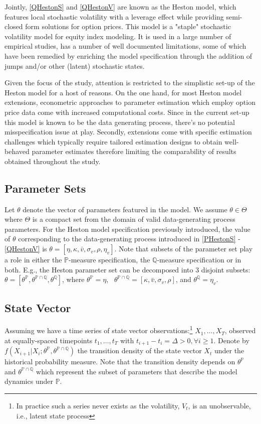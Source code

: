 \documentclass[11pt,a4paper,notitlepage]{article}
\numberwithin{equation}{section}
\begin{document}
Jointly, \ref{QHestonS} and \ref{QHestonV} are known as the Heston model, which features local stochastic volatility with a leverage effect while providing semi-closed form solutions for option prices. This model is a "staple" stochastic volatility model for equity index modeling. It is used in a large number of empirical studies, has a number of well documented limitations, some of which have been remedied by enriching the model specification through the addition of jumps and/or other (latent) stochastic states. 

Given the focus of the study, attention is restricted to the simplistic set-up of the Heston model for a host of reasons. On the one hand, for most Heston model extensions, econometric approaches to parameter estimation which employ option price data come with increased computational costs. Since in the current set-up this model is known to be the data generating process, there's no potential misspecification issue at play.
Secondly, extensions come with specific estimation challenges which typically require tailored estimation designs to obtain well-behaved parameter estimates therefore limiting the comparability of results obtained throughout the study. 

\subsection{Parameter Sets}
Let $\theta$ denote the vector of parameters featured in the model. We assume $\theta \in \Theta$ where $\Theta$ is a compact set from the domain of valid data-generating process parameters. For the Heston model specification previously introduced, the value of $\theta$ corresponding to the data-generating process introduced in \eqref{PHestonS} - \eqref{QHestonV} is $\theta = \left[\eta, \kappa, \bar{v}, \sigma_v, \rho, \eta_v\right]$. Note that subsets of the parameter set play a role in either the $\mathbb{P}$-measure specification, the $\mathbb{Q}$-measure specification or in both. E.g., the Heston parameter set can be decomposed into 3 disjoint subsets: $\theta = \left[\theta^\mathbb{P}, \theta^{\mathbb{P}\cap\mathbb{Q}}, \theta^\mathbb{Q}\right]$, where $\theta^\mathbb{P} = \eta$,~ $\theta^{\mathbb{P}\cap\mathbb{Q}} = \left[\kappa, \bar{v}, \sigma_v, \rho\right]$, and $\theta^\mathbb{Q} = \eta_v$. 

\subsection{State Vector}
Assuming we have a time series of state vector observations:\footnote{In practice such a series never exists as the volatility, $V_t$, is an unobservable, i.e., latent state process} $X_1, \dots, X_T$, observed at  equally-spaced timepoints $t_1,\dots,t_T$ with $t_{i+1} - t_i = \Delta >0, \forall i\geq 1 $. Denote by $f(X_{i+1} |X_i; \theta^\mathbb{P},  \theta^{\mathbb{P} \cap \mathbb{Q}})$ the transition density of the state vector $X_t$ under the historical probability measure. Note that the transition density depends on $\theta^\mathbb{P}$ and $\theta^{\mathbb{P} \cap \mathbb{Q}}$ which represent the subset of parameters that describe the model dynamics under $\mathbb{P}$.
\end{document}
